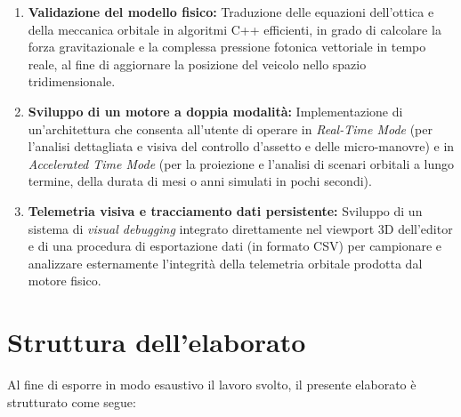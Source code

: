 \begin{enumerate}
    \item \textbf{Validazione del modello fisico:} Traduzione delle equazioni dell'ottica e della meccanica orbitale in algoritmi C++ efficienti, in grado di calcolare la forza gravitazionale e la complessa pressione fotonica vettoriale in tempo reale, al fine di aggiornare la posizione del veicolo nello spazio tridimensionale.
    \item \textbf{Sviluppo di un motore a doppia modalità:} Implementazione di un'architettura che consenta all'utente di operare in \textit{Real-Time Mode} (per l'analisi dettagliata e visiva del controllo d'assetto e delle micro-manovre) e in \textit{Accelerated Time Mode} (per la proiezione e l'analisi di scenari orbitali a lungo termine, della durata di mesi o anni simulati in pochi secondi).
    \item \textbf{Telemetria visiva e tracciamento dati persistente:} Sviluppo di un sistema di \textit{visual debugging} integrato direttamente nel viewport 3D dell'editor e di una procedura di esportazione dati (in formato CSV) per campionare e analizzare esternamente l'integrità della telemetria orbitale prodotta dal motore fisico.
\end{enumerate}


\section*{Struttura dell'elaborato}

Al fine di esporre in modo esaustivo il lavoro svolto, il presente elaborato è strutturato come segue:

